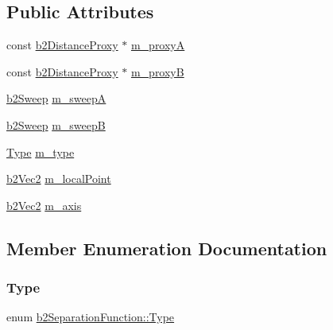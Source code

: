 \subsection*{Public Attributes}
\begin{DoxyCompactItemize}
\item 
const \mbox{\hyperlink{structb2_distance_proxy}{b2\+Distance\+Proxy}} $\ast$ \mbox{\hyperlink{structb2_separation_function_a5c03d798e97cd653aa7db390275bf9a7}{m\+\_\+proxyA}}
\item 
const \mbox{\hyperlink{structb2_distance_proxy}{b2\+Distance\+Proxy}} $\ast$ \mbox{\hyperlink{structb2_separation_function_a25fc938e03bf77ac276b17b24e52958f}{m\+\_\+proxyB}}
\item 
\mbox{\hyperlink{structb2_sweep}{b2\+Sweep}} \mbox{\hyperlink{structb2_separation_function_a46b838a661baa40cde771b779c2ff341}{m\+\_\+sweepA}}
\item 
\mbox{\hyperlink{structb2_sweep}{b2\+Sweep}} \mbox{\hyperlink{structb2_separation_function_a11ba433f6e524fb92390bd8b4dd376b6}{m\+\_\+sweepB}}
\item 
\mbox{\hyperlink{structb2_separation_function_a8c1446894223e9b6c80dc4d7230141a4}{Type}} \mbox{\hyperlink{structb2_separation_function_a51075eff2de404a1d82eee831fdfd4af}{m\+\_\+type}}
\item 
\mbox{\hyperlink{structb2_vec2}{b2\+Vec2}} \mbox{\hyperlink{structb2_separation_function_ab77a17de0f5c708212090f599ec1795e}{m\+\_\+local\+Point}}
\item 
\mbox{\hyperlink{structb2_vec2}{b2\+Vec2}} \mbox{\hyperlink{structb2_separation_function_a767b8fc4174d200ae8fb1d2bfba3407b}{m\+\_\+axis}}
\end{DoxyCompactItemize}


\subsection{Member Enumeration Documentation}
\mbox{\label{structb2_separation_function_a8c1446894223e9b6c80dc4d7230141a4}} 
\subsubsection{\texorpdfstring{Type}{Type}}
{\footnotesize\ttfamily enum \mbox{\hyperlink{structb2_separation_function_a8c1446894223e9b6c80dc4d7230141a4}{b2\+Separation\+Function\+::\+Type}}}

